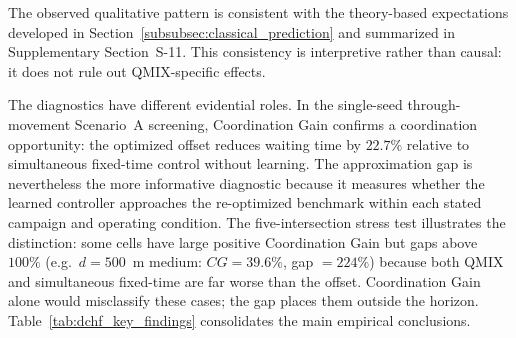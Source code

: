 \documentclass[review,12pt]{elsarticle}
\begin{document}
The observed qualitative pattern is consistent with the theory-based expectations developed in Section~\ref{subsubsec:classical_prediction} and summarized in Supplementary Section~S-11. This consistency is interpretive rather than causal: it does not rule out QMIX-specific effects.

The diagnostics have different evidential roles. In the single-seed
through-movement Scenario~A screening, Coordination Gain confirms a
coordination opportunity: the optimized offset reduces waiting time by
$22.7\%$ relative to simultaneous fixed-time control without learning.
The approximation gap is nevertheless the more informative diagnostic
because it measures whether the learned controller approaches the
re-optimized benchmark within each stated campaign and operating
condition. The five-intersection stress test illustrates the distinction: some cells have large positive Coordination Gain but gaps above $100\%$ (e.g.\ $d=500$~m medium: $CG=39.6\%$, gap $=224\%$) because both QMIX and simultaneous fixed-time are far worse than the offset. Coordination Gain alone would misclassify these cases; the gap places them outside the horizon. Table~\ref{tab:dchf_key_findings} consolidates the main empirical conclusions.
\end{document}
